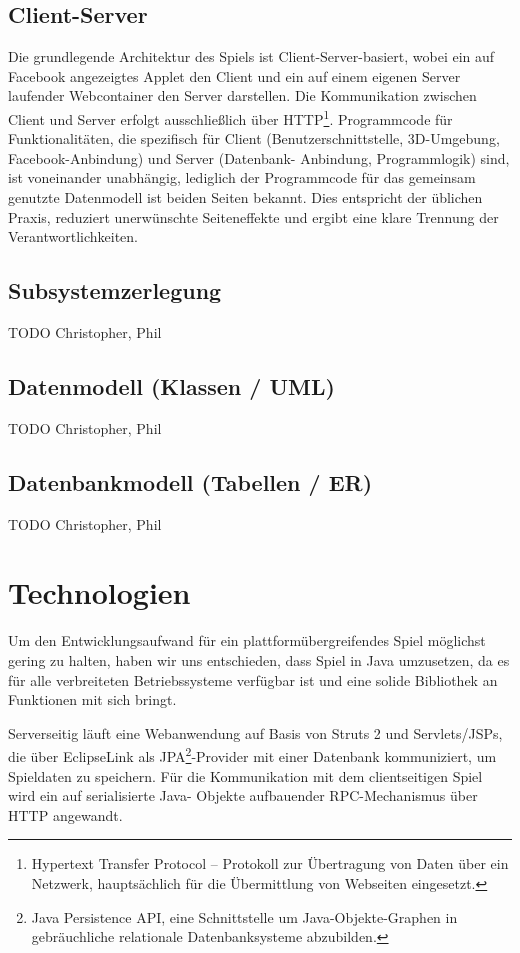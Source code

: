 \documentclass[a4paper,12pt]{scrartcl}
\begin{document}
\subsection{Client-Server}
Die grundlegende Architektur des Spiels ist Client-Server-basiert, wobei ein auf
Facebook angezeigtes Applet den Client und ein auf einem eigenen Server laufender
Webcontainer den Server darstellen. Die Kommunikation zwischen Client und Server erfolgt
ausschließlich über HTTP\footnote{Hypertext Transfer Protocol -- Protokoll zur
Übertragung von Daten über ein Netzwerk, hauptsächlich für die Übermittlung
von Webseiten eingesetzt.}. Programmcode für Funktionalitäten, die spezifisch
für Client (Benutzerschnittstelle, 3D-Umgebung, Facebook-Anbindung) und Server (Datenbank- Anbindung, Programmlogik) sind, ist voneinander unabhängig, lediglich der Programmcode für das gemeinsam genutzte Datenmodell ist beiden Seiten bekannt. Dies entspricht der üblichen Praxis, reduziert unerwünschte Seiteneffekte und ergibt eine klare Trennung der
Verantwortlichkeiten.

\subsection{Subsystemzerlegung}
TODO Christopher, Phil

\subsection{Datenmodell (Klassen / UML)}
TODO Christopher, Phil

\subsection{Datenbankmodell (Tabellen / ER)}
TODO Christopher, Phil

\section{Technologien}
Um den Entwicklungsaufwand für ein plattformübergreifendes Spiel möglichst gering
zu halten, haben wir uns entschieden, dass Spiel in Java umzusetzen, da es für alle
verbreiteten Betriebssysteme verfügbar ist und eine solide Bibliothek an Funktionen mit sich
bringt.

Serverseitig läuft eine Webanwendung auf Basis von Struts 2 und Servlets/JSPs, die
über EclipseLink als JPA\footnote{Java Persistence API, eine Schnittstelle um
Java-Objekte-Graphen in gebräuchliche relationale Datenbanksysteme
abzubilden.}-Provider mit einer Datenbank kommuniziert, um Spieldaten zu speichern. Für die Kommunikation mit dem clientseitigen Spiel wird ein auf serialisierte Java-
Objekte aufbauender RPC-Mechanismus über HTTP angewandt.
\end{document}
